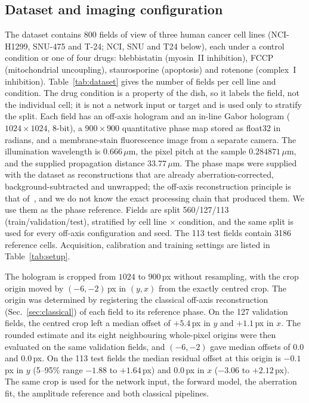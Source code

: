 \documentclass[11pt]{article}
\begin{document}
\subsection{Dataset and imaging configuration}
\label{sec:data}

The dataset contains 800 fields of view of three human cancer cell lines
(NCI-H1299, SNU-475 and T-24; NCI, SNU and T24 below), each under a control
condition or one of four drugs: blebbistatin (myosin~II inhibition), FCCP
(mitochondrial uncoupling), staurosporine (apoptosis) and rotenone (complex~I
inhibition). Table~\ref{tab:dataset} gives the number of fields per cell line
and condition. The drug condition is a property of the dish, so it labels the
field, not the individual cell; it is not a network input or target and is used
only to stratify the split. Each field has an off-axis hologram and an in-line
Gabor hologram ($1024\times1024$, 8-bit), a $900\times900$ quantitative phase
map stored as float32 in radians, and a membrane-stain fluorescence image from a
separate camera. The illumination wavelength is $0.666\,\mu$m, the pixel pitch
at the sample $0.284871\,\mu$m, and the supplied propagation distance
$33.77\,\mu$m. The phase maps were supplied with the dataset as reconstructions
that are already aberration-corrected, background-subtracted and unwrapped; the
off-axis reconstruction principle is that of~\cite{cuche1999}, and we do not
know the exact processing chain that produced them. We use them as the phase
reference. Fields are split 560/127/113 (train/validation/test), stratified by
cell line $\times$ condition, and the same split is used for every off-axis
configuration and seed. The 113 test fields contain 3186 reference cells.
Acquisition, calibration and training settings are listed in
Table~\ref{tab:setup}.



The hologram is cropped from $1024$ to $900$\,px without resampling, with the
crop origin moved by $(-6, -2)$\,px in $(y, x)$ from the exactly centred crop.
The origin was determined by registering the classical off-axis reconstruction
(Sec.~\ref{sec:classical}) of each field to its reference phase. On the 127
validation fields, the centred crop left a median offset of $+5.4$\,px in $y$
and $+1.1$\,px in $x$. The rounded estimate and its eight neighbouring
whole-pixel origins were then evaluated on the same validation fields, and
$(-6,-2)$ gave median offsets of $0.0$ and $0.0$\,px. On the 113 test fields
the median residual offset at this origin is $-0.1$\,px in $y$ (5--95\%
range $-1.88$ to $+1.64$\,px) and $0.0$\,px in $x$ ($-3.06$ to $+2.12$\,px).
The same crop is used for the network input, the forward model, the
aberration fit, the amplitude reference and both classical pipelines.
\end{document}
